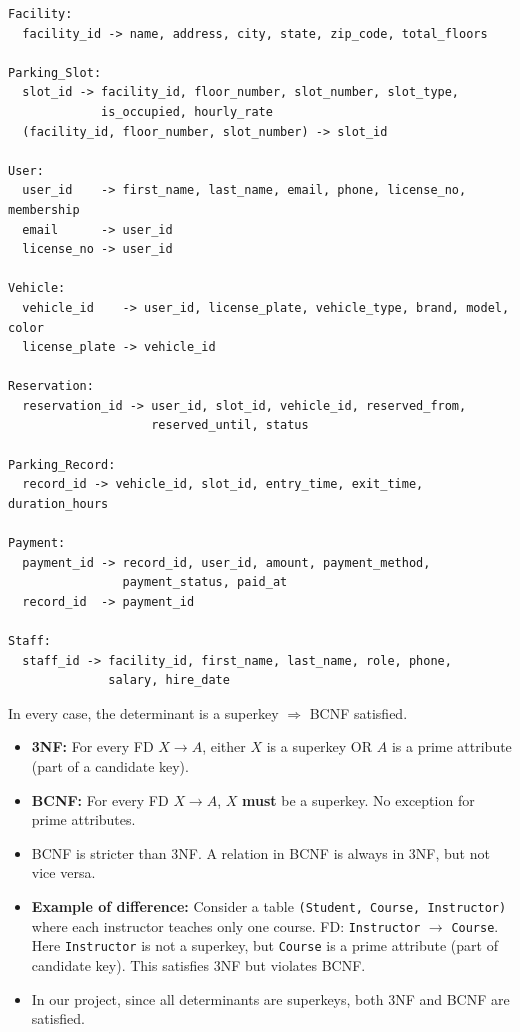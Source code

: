\documentclass[12pt,a4paper]{article}
\begin{document}
\begin{questionbox}
\end{questionbox}
\begin{answerbox}
\begin{lstlisting}[language={},basicstyle=\ttfamily\small,backgroundcolor=\color{white},frame=none]
Facility:
  facility_id -> name, address, city, state, zip_code, total_floors

Parking_Slot:
  slot_id -> facility_id, floor_number, slot_number, slot_type,
             is_occupied, hourly_rate
  (facility_id, floor_number, slot_number) -> slot_id

User:
  user_id    -> first_name, last_name, email, phone, license_no, membership
  email      -> user_id
  license_no -> user_id

Vehicle:
  vehicle_id    -> user_id, license_plate, vehicle_type, brand, model, color
  license_plate -> vehicle_id

Reservation:
  reservation_id -> user_id, slot_id, vehicle_id, reserved_from,
                    reserved_until, status

Parking_Record:
  record_id -> vehicle_id, slot_id, entry_time, exit_time, duration_hours

Payment:
  payment_id -> record_id, user_id, amount, payment_method,
                payment_status, paid_at
  record_id  -> payment_id

Staff:
  staff_id -> facility_id, first_name, last_name, role, phone,
              salary, hire_date
\end{lstlisting}
In every case, the determinant is a superkey $\Rightarrow$ BCNF satisfied.
\end{answerbox}

\begin{questionbox}
\end{questionbox}
\begin{answerbox}
\begin{itemize}[nosep]
    \item \textbf{3NF:} For every FD $X \rightarrow A$, either $X$ is a superkey OR $A$ is a prime attribute (part of a candidate key).
    \item \textbf{BCNF:} For every FD $X \rightarrow A$, $X$ \textbf{must} be a superkey. No exception for prime attributes.
    \item BCNF is stricter than 3NF. A relation in BCNF is always in 3NF, but not vice versa.
    \item \textbf{Example of difference:} Consider a table \texttt{(Student, Course, Instructor)} where each instructor teaches only one course. FD: \texttt{Instructor} $\rightarrow$ \texttt{Course}. Here \texttt{Instructor} is not a superkey, but \texttt{Course} is a prime attribute (part of candidate key). This satisfies 3NF but violates BCNF.
    \item In our project, since all determinants are superkeys, both 3NF and BCNF are satisfied.
\end{itemize}
\end{answerbox}
\end{document}
